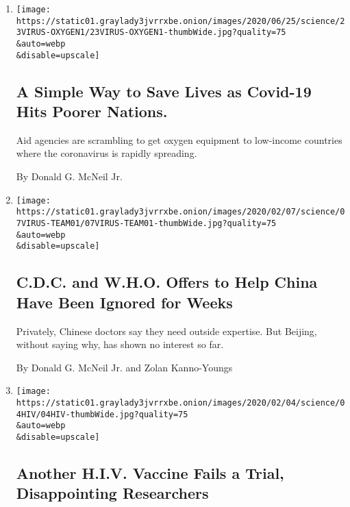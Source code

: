 \begin{enumerate}
\def\labelenumi{\arabic{enumi}.}
\item
  \href{/2020/06/23/health/coronavirus-oxygen-africa.html}{}

  \texttt{[image: https://static01.graylady3jvrrxbe.onion/images/2020/06/25/science/23VIRUS-OXYGEN1/23VIRUS-OXYGEN1-thumbWide.jpg?quality=75\\\&auto=webp\\\&disable=upscale]}

  \hypertarget{a-simple-way-to-save-lives-as-covid-19-hits-poorer-nations}{%
  \subsection{A Simple Way to Save Lives as Covid-19 Hits Poorer
  Nations.}\label{a-simple-way-to-save-lives-as-covid-19-hits-poorer-nations}}

  Aid agencies are scrambling to get oxygen equipment to low-income
  countries where the coronavirus is rapidly spreading.

  By Donald G. McNeil Jr.
\item
  \href{/2020/02/07/health/cdc-coronavirus-china.html}{}

  \texttt{[image: https://static01.graylady3jvrrxbe.onion/images/2020/02/07/science/07VIRUS-TEAM01/07VIRUS-TEAM01-thumbWide.jpg?quality=75\\\&auto=webp\\\&disable=upscale]}

  \hypertarget{cdc-and-who-offers-to-help-china-have-been-ignored-for-weeks}{%
  \subsection{C.D.C. and W.H.O. Offers to Help China Have Been Ignored
  for
  Weeks}\label{cdc-and-who-offers-to-help-china-have-been-ignored-for-weeks}}

  Privately, Chinese doctors say they need outside expertise. But
  Beijing, without saying why, has shown no interest so far.

  By Donald G. McNeil Jr. and Zolan Kanno-Youngs
\item
  \href{/2020/02/04/health/hiv-vaccine.html}{}

  \texttt{[image: https://static01.graylady3jvrrxbe.onion/images/2020/02/04/science/04HIV/04HIV-thumbWide.jpg?quality=75\\\&auto=webp\\\&disable=upscale]}

  \hypertarget{another-hiv-vaccine-fails-a-trial-disappointing-researchers}{%
  \subsection{Another H.I.V. Vaccine Fails a Trial, Disappointing
  Researchers}\label{another-hiv-vaccine-fails-a-trial-disappointing-researchers}}


\end{enumerate}
